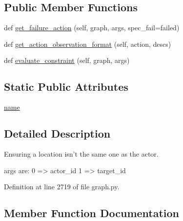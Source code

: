 \subsection*{Public Member Functions}
\begin{DoxyCompactItemize}
\item 
def \hyperlink{classlight__chats_1_1graph_1_1NotLocationOfConstraint_a77abc55b110bb7287c88b7623fe06d13}{get\+\_\+failure\+\_\+action} (self, graph, args, spec\+\_\+fail=\textquotesingle{}failed\textquotesingle{})
\item 
def \hyperlink{classlight__chats_1_1graph_1_1NotLocationOfConstraint_a4b286f6eeac9d64784dc03087771dc72}{get\+\_\+action\+\_\+observation\+\_\+format} (self, action, descs)
\item 
def \hyperlink{classlight__chats_1_1graph_1_1NotLocationOfConstraint_a0ce5d519bdec3eb540e09bdec4cc3bef}{evaluate\+\_\+constraint} (self, graph, args)
\end{DoxyCompactItemize}
\subsection*{Static Public Attributes}
\begin{DoxyCompactItemize}
\item 
\hyperlink{classlight__chats_1_1graph_1_1NotLocationOfConstraint_ace5fdafd6b230645ba96317bbf254c42}{name}
\end{DoxyCompactItemize}


\subsection{Detailed Description}
\begin{DoxyVerb}Ensuring a location isn't the same one as the actor.

args are:     0 => actor_id     1 => target_id
\end{DoxyVerb}
 

Definition at line 2719 of file graph.\+py.



\subsection{Member Function Documentation}
\mbox{\label{classlight__chats_1_1graph_1_1NotLocationOfConstraint_a0ce5d519bdec3eb540e09bdec4cc3bef}} 
